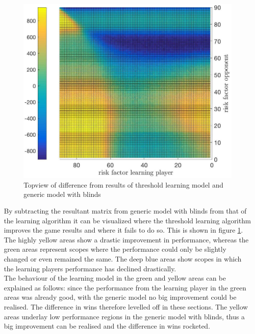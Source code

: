 \documentclass[11pt]{article}
\begin{document}
\begin{figure}
\begin{center}
\includegraphics[scale=.3]{Graphics/allDataWins_Threshold_Difference}
\end{center}
\caption{Topview of difference from results of threshold learning model and generic model with blinds}
\label{allDataWins_Threshold_Difference}
\end{figure}

By subtracting the resultant matrix from generic model with blinds from that of the learning algorithm it can be visualized where the threshold learning algorithm improves the game results and where it fails to do so. This is shown in figure \ref{allDataWins_Threshold_Difference}. The highly yellow areas show a drastic improvement in performance, whereas the green areas represent scopes where the performance could only be slightly changed or even remained the same. The deep blue areas show scopes in which the learning players performance has declined drastically.\\

The behaviour of the learning model in the green and yellow areas can be explained as follows: since the performance from the learning player in the green areas was already good, with the generic model no big improvement could be realised. The difference in wins therefore levelled off in these sections. The yellow areas underlay low performance regions in the generic model with blinds, thus a big improvement can be realised and the difference in wins rocketed.\\
\end{document}
